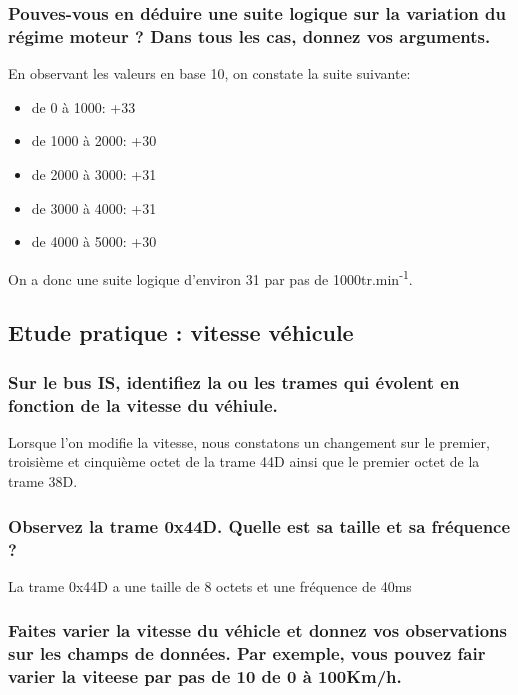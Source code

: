 \documentclass{rapportECC}
\begin{document}
\subsubsection*{Pouves-vous en déduire une suite logique sur la variation du régime moteur ? Dans tous les cas, donnez vos arguments.}

En observant les valeurs en base 10, on constate la suite suivante:

\begin{itemize}
    \item de 0 à 1000: +33
    \item de 1000 à 2000: +30
    \item de 2000 à 3000: +31
    \item de 3000 à 4000: +31
    \item de 4000 à 5000: +30
\end{itemize}

On a donc une suite logique d'environ 31 par pas de 1000tr.min\textsuperscript{-1}.


\subsection{Etude pratique : vitesse véhicule}

\subsubsection*{Sur le bus IS, identifiez la ou les trames qui évolent en fonction de la vitesse du véhiule.}

Lorsque l'on modifie la vitesse, nous constatons un changement sur le premier, troisième et cinquième octet de la trame 44D ainsi que le premier octet de la trame 38D.

\subsubsection*{Observez la trame 0x44D. Quelle est sa taille et sa fréquence ?}

La trame 0x44D a une taille de 8 octets et une fréquence de 40ms

\subsubsection*{Faites varier la vitesse du véhicle et donnez vos observations sur les champs de données. Par exemple, vous pouvez fair varier la viteese par pas de 10 de 0 à 100Km/h.}
\end{document}
